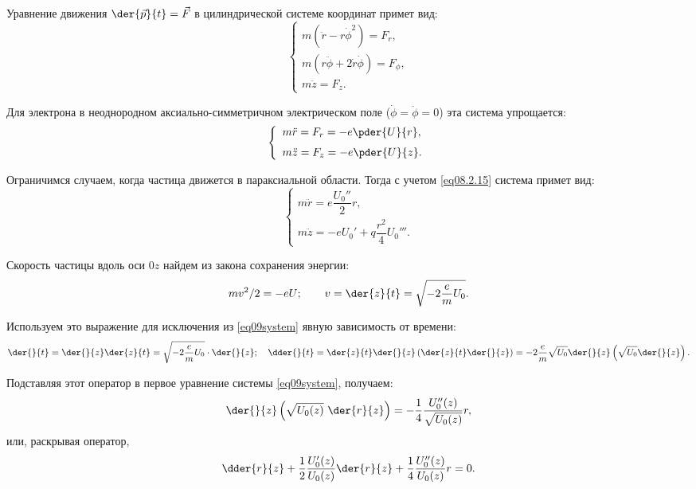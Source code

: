 
Уравнение движения
\( \displaystyle
  \der{\vec{p}}{t} = \vec{F}
\)
в цилиндрической системе координат примет вид:
\[
  \left\{
    \begin{array}{l}
      m(\ddot{r} - r\dot{\phi}^2) = F_r, \\
      m(r\ddot{\phi} + 2\dot{r}\dot{\phi}) = F_\phi, \\
      m\ddot{z} = F_z.
    \end{array}
  \right.
\]

Для электрона в неоднородном аксиально-симметричном электрическом поле
(\( \dot{\phi} = \ddot{\phi} = 0 \)) эта система упрощается:
\[
  \left\{
    \begin{array}{l}
      \displaystyle m\ddot{r} = F_r = -e\pder{U}{r}, \\[.6em]
      \displaystyle m\ddot{z} = F_z = -e\pder{U}{z}.
    \end{array}
  \right.
\]

Ограничимся случаем, когда частица движется в параксиальной области. Тогда с
учетом \eqref{eq08.2.15} система примет вид:
\begin{equation}
  \left\{
    \begin{array}{l}
      m\ddot{r} = e\dfrac{U_0''}{2}r, \\
      m\ddot{z} = -eU_0' + q\dfrac{r^2}{4}U_0'''.
    \end{array}
  \right.
  \label{eq09system}
\end{equation}

Скорость частицы вдоль оси \( 0z \) найдем из закона сохранения энергии:
\[
  mv^2 / 2 = -eU; \qquad
    v = \der{z}{t} = \sqrt{-2\frac{e}{m}U_0}.
\]

Используем это выражение для исключения из \eqref{eq09system} явную зависимость
от времени:
\[
  \der{}{t} = \der{}{z}\der{z}{t} = \sqrt{-2\frac{e}{m}U_0}\cdot\der{}{z}; \quad
    \dder{}{t} = \der{z}{t}\der{}{z} \left( \der{z}{t}\der{}{z} \right) =
    -2\frac{e}{m}\sqrt{U_0}\der{}{z} \left( \sqrt{U_0}\der{}{z} \right).
\]

Подставляя этот оператор в первое уравнение системы \eqref{eq09system},
получаем:
\begin{equation}
  \der{}{z} \left( \sqrt{U_0(z)}\ \der{r}{z} \right) = -\frac{1}{4}
    \frac{U_0''(z)}{\sqrt{U_0(z)}} r,
  \label{eq09equation}
\end{equation}
или, раскрывая оператор,
\begin{equation}
  \dder{r}{z} + \frac{1}{2} \frac{U_0'(z)}{U_0(z)} \der{r}{z} + \frac{1}{4}
    \frac{U_0''(z)}{U_0(z)} r = 0.
  \label{eq09paraxial}
\end{equation}

